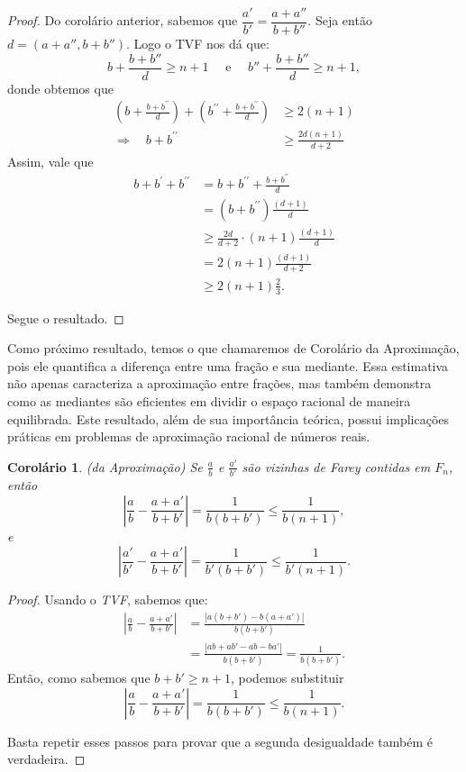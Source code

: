 \documentclass{hipatia}
\newtheorem*{corollary*}{Corolário} %
\theoremstyle{definition} %
\begin{document}
\begin{proof}
    Do corolário anterior, sabemos que $\dfrac{a'}{b'} = \dfrac{a + a''}{b + b''}$. Seja então $d=(a+a'',b+b'')$. Logo o TVF nos dá que:
    $$
    b+\frac{b+b''}{d}\geq n+1\quad \text{ e } \quad b''+\frac{b+b''}{d}\geq n+1,
    $$
\noindent donde obtemos que 
$$
\begin{aligned}
\left(b+\frac{b+b^{\prime \prime}}{d}\right)+\left(b^{\prime \prime}+\frac{b+b^{\prime \prime}}{d}\right) & \geqslant 2(n+1) \\
\Rightarrow \quad b+b^{\prime \prime} & \geqslant \frac{2 d(n+1)}{d+2}
\end{aligned}
$$
Assim, vale que 
$$
\begin{aligned}
b+b^{\prime}+b^{\prime \prime} & =b+b^{\prime \prime}+\frac{b+b^{\prime \prime}}{d} \\
& =\left(b+b^{\prime \prime}\right) \frac{(d+1)}{d} \\
& \geqslant \frac{2 d}{d+2} \cdot(n+1) \frac{(d+1)}{d} \\
& =2(n+1) \frac{(d+1)}{d+2}\\
&\geq 2(n+1) \frac{2}{3}.
\end{aligned}
$$

Segue o resultado.
    
\end{proof}


Como próximo resultado, temos o que chamaremos de Corolário da Aproximação, pois ele quantifica a diferença entre uma fração e sua mediante. Essa estimativa não apenas caracteriza a aproximação entre frações, mas também demonstra como as mediantes são eficientes em dividir o espaço racional de maneira equilibrada. Este resultado, além de sua importância teórica, possui implicações práticas em problemas de aproximação racional de números reais.

\begin{corollary*} (da Aproximação)
Se \(\frac{a}{b}\) e \(\frac{a'}{b'}\) são vizinhas de Farey contidas em \(F_n\), então
\[
\left| \frac{a}{b} - \frac{a + a'}{b + b'} \right| = \frac{1}{b(b + b')} \leq \frac{1}{b(n + 1)},
\]
e
\[
\left| \frac{a'}{b'} - \frac{a + a'}{b + b'} \right| = \frac{1}{b'(b + b')} \leq \frac{1}{b'(n + 1)}.
\]
\end{corollary*}



\begin{proof}
Usando o \textit{TVF}, sabemos que:
\begin{align*}
\left| \frac{a}{b} - \frac{a + a'}{b + b'} \right| &= \frac{|a(b + b') - b(a + a')|}{b(b + b')} \\
&= \frac{|ab + ab' - ab - ba'|}{b(b + b')} = \frac{1}{b(b + b')}.
\end{align*}
Então, como sabemos que \(b + b' \geq n + 1\), podemos substituir
\[
\left| \frac{a}{b} - \frac{a + a'}{b + b'} \right| = \frac{1}{b(b + b')} \leq \frac{1}{b(n + 1)}.
\]

Basta repetir esses passos para provar que a segunda desigualdade também é verdadeira.
\end{proof}
\end{document}
